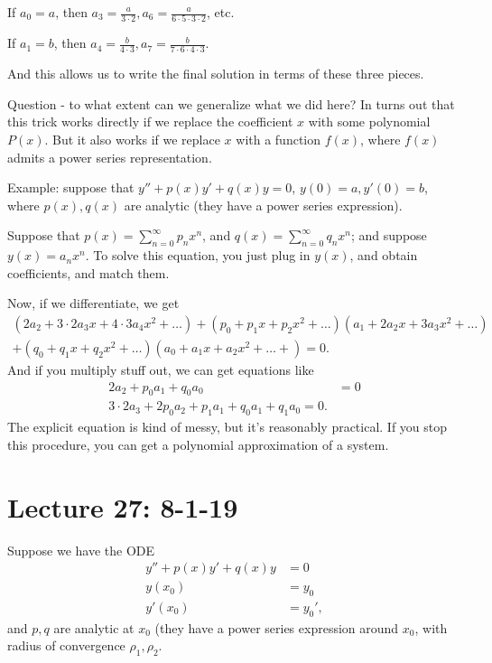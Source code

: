 \documentclass{article}
\begin{document}
If $a_0 = a$, then $a_3 = \frac{a}{3 \cdot 2}, a_6 = \frac{a}{6 \cdot 5 \cdot 3 \cdot 2}$, etc.

If $a_1 = b$, then $a_4 = \frac{b}{4 \cdot 3}, a_7 = \frac{b}{7 \cdot 6 \cdot 4 \cdot 3}$.

And this allows us to write the final solution in terms of these three pieces.

Question - to what extent can we generalize what we did here?  In turns out that this trick works directly if we replace the coefficient $x$ with some polynomial $P(x)$.  But it also works if we replace $x$ with a function $f(x)$, where $f(x)$ admits a power series representation.

Example: suppose that $y'' + p(x) y' + q(x) y = 0$, $y(0) = a, y'(0) = b$, where $p(x) , q(x)$ are analytic (they have a power series expression).

Suppose that $p(x) = \sum_{n=0}^{\infty} p_n x^n$, and $q(x) = \sum_{n=0}^{\infty} q_n x^n$; and suppose $y(x) = a_n x^n$.  To solve this equation, you just plug in $y(x)$, and obtain coefficients, and match them.

Now, if we differentiate, we get
\begin{align*}
  (2 a_2 + 3 \cdot 2 a_3 x + 4 \cdot 3 a_4 x^2 + \dots ) + (p_0 + p_1 x + p_2 x^2 + \dots ) ( a_1 + 2 a_2 x + 3 a_3 x^2 + \dots )  \\
  + (q_0 + q_1 x + q_2 x^2 + \dots )(a_0 + a_1x + a_2 x^2 + \dots + ) = 0.
\end{align*}
And if you multiply stuff out, we can get equations like
\begin{align*}
  2 a_2 + p_0 a_1 + q_0 a_0 &= 0\\
  3 \cdot 2 a_3 + 2 p_0 a_2 + p_1 a_1 + q_0 a_1 + q_1 a_0 = 0.
\end{align*}
The explicit equation is kind of messy, but it's reasonably practical.  If you stop this procedure, you can get a polynomial approximation of a system.
\section{Lecture 27: 8-1-19}

Suppose we have the ODE
\begin{align*}
  y'' + p(x) y' + q(x) y &= 0 \\
  y(x_0) &= y_0 \\
  y'(x_0) &= y_0',
\end{align*}
and $p, q$ are analytic at $x_0$ (they have a power series expression around $x_0$, with radius of convergence $\rho_1, \rho_2$.
\end{document}
